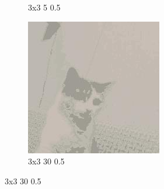 \documentclass[12pt,a4paper]{article}
\begin{document}
\begin{figure}[H]
\begin{subfigure}{0.25\textwidth}
  \caption{3x3 5 0.5}
  \label{fig:2}
\end{subfigure}\hfil %
\begin{subfigure}{0.25\textwidth}
  \includegraphics[width=\linewidth]{images/small/3-3-30-05}
  \caption{3x3 30 0.5}
  \label{fig:3}
\end{subfigure}


\end{figure}
\end{document}
